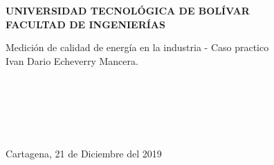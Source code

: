 \thispagestyle{empty}
\null

\begin{center}
  {\bf UNIVERSIDAD TECNOLÓGICA DE BOLÍVAR}\\
  \vfill
  {\bf FACULTAD DE INGENIERÍAS}
\end{center}

\vfill
\vfill
\vfill

 \expandafter{Medición de calidad de energía en la industria - Caso practico}\\
\vfill
{} Ivan Dario Echeverry Mancera.\\

\vfill
\vfill
\vfill
\vfill
\vfill

\signature{Jurado}\\

\vfill
\vfill
\vfill
\vfill
\vfill

\signature{Jurado}\\

\vfill
\vfill
\vfill
\vfill
\vfill

\signature{Director: Víctor Manuel Garrido Arévalo}\\

\vfill
\vfill
\vfill
\vfill
\vfill
\vfill

\noindent\noindent Cartagena, 21 de Diciembre del 2019\\

\newpage

